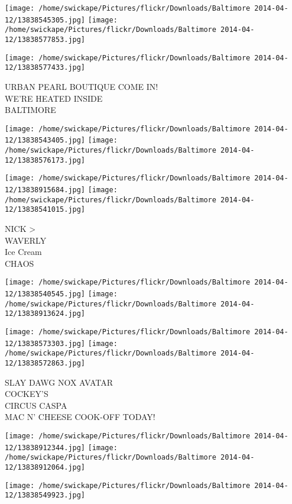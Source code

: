 \documentclass[10pt,letterpaper]{article}
\begin{document}
\texttt{[image: /home/swickape/Pictures/flickr/Downloads/Baltimore 2014-04-12/13838545305.jpg]}
\texttt{[image: /home/swickape/Pictures/flickr/Downloads/Baltimore 2014-04-12/13838577853.jpg]}

\vspace{0.25in}
\texttt{[image: /home/swickape/Pictures/flickr/Downloads/Baltimore 2014-04-12/13838577433.jpg]}

URBAN PEARL BOUTIQUE COME IN!\\
WE'RE HEATED INSIDE\\
BALTIMORE
\pagebreak

\texttt{[image: /home/swickape/Pictures/flickr/Downloads/Baltimore 2014-04-12/13838543405.jpg]}
\texttt{[image: /home/swickape/Pictures/flickr/Downloads/Baltimore 2014-04-12/13838576173.jpg]}

\texttt{[image: /home/swickape/Pictures/flickr/Downloads/Baltimore 2014-04-12/13838915684.jpg]}
\texttt{[image: /home/swickape/Pictures/flickr/Downloads/Baltimore 2014-04-12/13838541015.jpg]}

NICK >\\
WAVERLY\\
Ice Cream\\
CHAOS
\pagebreak

\texttt{[image: /home/swickape/Pictures/flickr/Downloads/Baltimore 2014-04-12/13838540545.jpg]}
\texttt{[image: /home/swickape/Pictures/flickr/Downloads/Baltimore 2014-04-12/13838913624.jpg]}

\texttt{[image: /home/swickape/Pictures/flickr/Downloads/Baltimore 2014-04-12/13838573303.jpg]}
\texttt{[image: /home/swickape/Pictures/flickr/Downloads/Baltimore 2014-04-12/13838572863.jpg]}

SLAY DAWG NOX AVATAR\\
COCKEY'S\\
CIRCUS CASPA\\
MAC N' CHEESE COOK{-}OFF TODAY!
\pagebreak

\texttt{[image: /home/swickape/Pictures/flickr/Downloads/Baltimore 2014-04-12/13838912344.jpg]}
\texttt{[image: /home/swickape/Pictures/flickr/Downloads/Baltimore 2014-04-12/13838912064.jpg]}

\texttt{[image: /home/swickape/Pictures/flickr/Downloads/Baltimore 2014-04-12/13838549923.jpg]}
\end{document}
